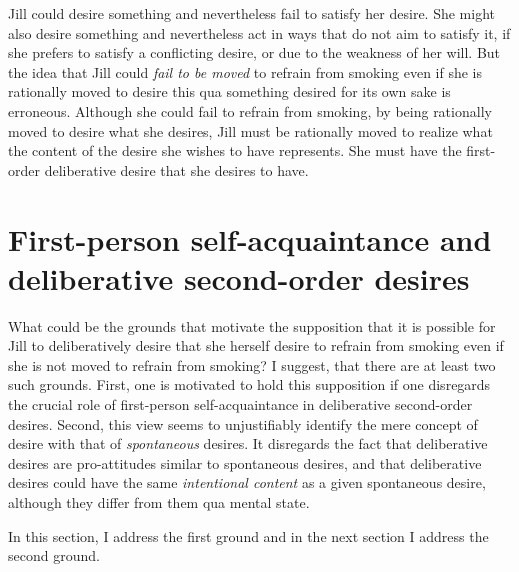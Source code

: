 \documentclass[output=paper,colorlinks,citecolor=brown
]{langscibook}
\begin{document}
Jill could desire something and nevertheless fail to satisfy her desire. She might also desire something and nevertheless act in ways that do not aim to satisfy it, if she prefers to satisfy a conflicting desire, or due to the weakness of her will. But the idea that Jill could \textit{fail to be moved} to refrain from smoking even if she is rationally moved to desire this qua something desired for its own sake is erroneous. Although she could fail to refrain from smoking, by being rationally moved to desire what she desires, Jill must be rationally moved to realize what the content of the desire she wishes to have represents. She must have the first-order deliberative desire that she desires to have.

\section{First-person self-acquaintance and deliberative second-order desires}

What could be the grounds that motivate the supposition that it is possible for Jill to deliberatively desire that she herself desire to refrain from smoking even if she is not moved to refrain from smoking? I suggest, that there are at least two such grounds. First, one is motivated to hold this supposition if one disregards the crucial role of first-person self-acquaintance in deliberative second-order desires. Second, this view seems to unjustifiably identify the mere concept of desire with that of \textit{spontaneous} desires. It disregards the fact that deliberative desires are pro-attitudes similar to spontaneous desires, and that deliberative desires could have the same \textit{intentional content} as a given spontaneous desire, although they differ from them qua mental state. 

In this section, I address the first ground and in the next section I address the second ground. 
\end{document}
